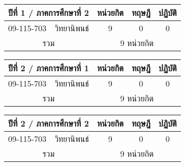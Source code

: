 \vspace{5ex}\par\noindent 
\renewcommand{\arraystretch}{1.4}
\begin{tabular}{|cp{}|ccc|}
\hline
\multicolumn{2}{|c|}{ปีที่ 1 / ภาคการศึกษาที่ 2} & \multicolumn{1}{c|}{หน่วยกิต} & \multicolumn{1}{c|}{ทฤษฎี} & \multicolumn{1}{c|}{ปฏิบัติ}  \\ \hline
\multicolumn{1}{|c|}{09-115-703}  & วิทยานิพนธ์  & \multicolumn{1}{c|}{9}        & \multicolumn{1}{c|}{0}     & \multicolumn{1}{c|}{0}                    \\ \hline
\multicolumn{2}{|c|}{รวม}                        & \multicolumn{3}{c|}{9 หน่วยกิต}                                                                            \\ \hline
\end{tabular}

\vspace{5ex}\par\noindent 
\renewcommand{\arraystretch}{1.4}
\begin{tabular}{|cp{}|ccc|}
\hline
\multicolumn{2}{|c|}{ปีที่ 2 / ภาคการศึกษาที่ 1} & \multicolumn{1}{c|}{หน่วยกิต} & \multicolumn{1}{c|}{ทฤษฎี} & \multicolumn{1}{c|}{ปฏิบัติ}  \\ \hline
\multicolumn{1}{|c|}{09-115-703}  & วิทยานิพนธ์  & \multicolumn{1}{c|}{9}        & \multicolumn{1}{c|}{0}     & \multicolumn{1}{c|}{0}                    \\ \hline
\multicolumn{2}{|c|}{รวม}                        & \multicolumn{3}{c|}{9 หน่วยกิต}                                                                            \\ \hline
\end{tabular}

\vspace{5ex}\par\noindent 
\renewcommand{\arraystretch}{1.4}
\begin{tabular}{|cp{}|ccc|}
\hline
\multicolumn{2}{|c|}{ปีที่ 2 / ภาคการศึกษาที่ 2} & \multicolumn{1}{c|}{หน่วยกิต} & \multicolumn{1}{c|}{ทฤษฎี} & \multicolumn{1}{c|}{ปฏิบัติ}  \\ \hline
\multicolumn{1}{|c|}{09-115-703}  & วิทยานิพนธ์  & \multicolumn{1}{c|}{9}        & \multicolumn{1}{c|}{0}     & \multicolumn{1}{c|}{0}                   \\ \hline
\multicolumn{2}{|c|}{รวม}                        & \multicolumn{3}{c|}{9 หน่วยกิต}                                                                            \\ \hline
\end{tabular}



